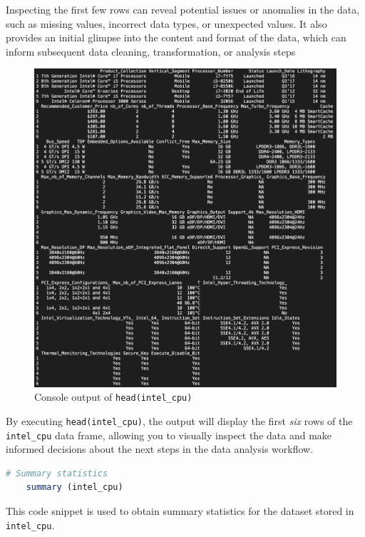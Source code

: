 Inspecting the first few rows can reveal potential issues or anomalies in the data, such as missing values, incorrect data types, or unexpected values. It also provides an initial glimpse into the content and format of the data, which can inform subsequent data cleaning, transformation, or analysis steps

\begin{figure}[H]
    \centering
    \includegraphics[width=14cm]{graphics/head.png}
    \caption*{Console output of \texttt{head(intel\_cpu)}}
\end{figure}

By executing \texttt{head(intel\_cpu)}, the output will display the first \textit{six} rows of the \texttt{intel\_cpu} data frame, allowing you to visually inspect the data and make informed decisions about the next steps in the data analysis workflow.

\newpage

\begin{lstlisting}[language=R]
    # Summary statistics
    summary (intel_cpu)
\end{lstlisting}

This code snippet is used to obtain summary statistics for the dataset stored in \texttt{intel\_cpu}.\\

